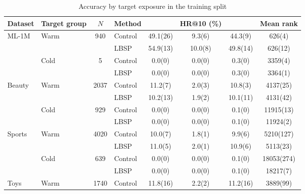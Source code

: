 \begin{table}[!htbp]
\centering
\caption{Accuracy by target exposure in the training split}
\label{tab:x7-target-accuracy}
\fontsize{8.5}{11}\selectfont
\setlength{\tabcolsep}{1.6pt}
\renewcommand{\arraystretch}{1.15}
\begin{tabular*}{\textwidth}{@{\extracolsep{\fill}}llS[table-format=4.0]lS[table-format=2.1(3)]S[table-format=2.1(3)]S[table-format=2.1(3)]S[table-format=5.0(3),table-align-uncertainty=false]@{}}
\toprule
Dataset & Target group & {$N$} & Method & {} & {HR@10 (\%)} & {} & {Mean rank}\\
\midrule
ML-1M & Warm & 940 & Control & 49.1(26) & 9.3(6) & 44.3(9) & 626(4)\\ %
 &  &  & LBSP & 54.9(13) & 10.0(8) & 49.8(14) & 626(12)\\ %
 & Cold & 5 & Control & 0.0(0) & 0.0(0) & 0.3(0) & 3359(4)\\ %
 &  &  & LBSP & 0.0(0) & 0.0(0) & 0.3(0) & 3364(1)\\ %
\midrule
Beauty & Warm & 2037 & Control & 11.2(7) & 2.0(3) & 10.8(3) & 4137(25)\\ %
 &  &  & LBSP & 10.2(13) & 1.9(2) & 10.1(11) & 4131(42)\\ %
 & Cold & 929 & Control & 0.0(0) & 0.0(0) & 0.1(0) & 11915(13)\\ %
 &  &  & LBSP & 0.0(0) & 0.0(0) & 0.1(0) & 11924(2)\\ %
\midrule
Sports & Warm & 4020 & Control & 10.0(7) & 1.8(1) & 9.9(6) & 5210(127)\\ %
 &  &  & LBSP & 11.0(5) & 2.0(1) & 10.9(6) & 5113(23)\\ %
 & Cold & 639 & Control & 0.0(0) & 0.0(0) & 0.1(0) & 18053(274)\\ %
 &  &  & LBSP & 0.0(0) & 0.0(0) & 0.1(0) & 18217(7)\\ %
\midrule
Toys & Warm & 1740 & Control & 11.8(16) & 2.2(2) & 11.2(16) & 3889(99)\\ %

\end{tabular*}
\end{table}
